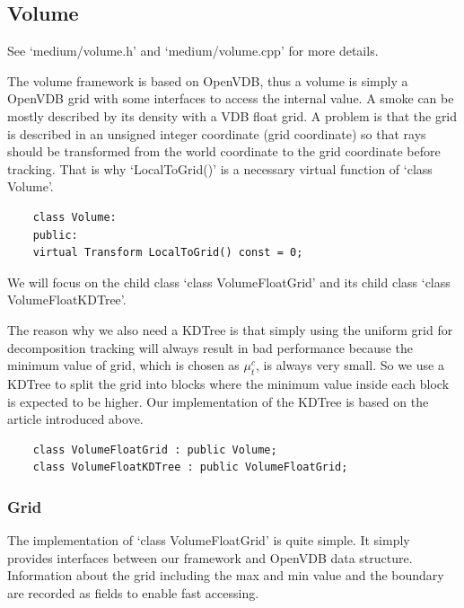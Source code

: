 \documentclass[acmtog]{acmart}
\begin{document}
\subsection{Volume}
See `medium/volume.h' and `medium/volume.cpp' for more details.\par
The volume framework is based on OpenVDB, 
thus a volume is simply a OpenVDB grid with some interfaces to access the internal value.
A smoke can be mostly described by its density with a VDB float grid.
A problem is that the grid is described in an unsigned integer coordinate (grid coordinate) so that
rays should be transformed from the world coordinate to the grid coordinate before tracking.
That is why `LocalToGrid()' is a necessary virtual function of `class Volume'.
\begin{lstlisting}
	class Volume:
	public:
	virtual Transform LocalToGrid() const = 0;
\end{lstlisting}
We will focus on the child class `class VolumeFloatGrid' and its child class `class VolumeFloatKDTree'.\par
The reason why we also need a KDTree is that 
simply using the uniform grid for decomposition tracking will always result in bad performance 
because the minimum value of grid, which is chosen as $\mu_t^c$, is always very small.
So we use a KDTree to split the grid into blocks where the minimum value inside each block is expected to be higher.
Our implementation of the KDTree is based on the article introduced above.
\begin{lstlisting}
	class VolumeFloatGrid : public Volume;
	class VolumeFloatKDTree : public VolumeFloatGrid;
\end{lstlisting}

\subsubsection{Grid}
The implementation of `class VolumeFloatGrid' is quite simple.
It simply provides interfaces between our framework and OpenVDB data structure.
Information about the grid including the max and min value and the boundary are recorded as fields to enable fast accessing.
\end{document}
